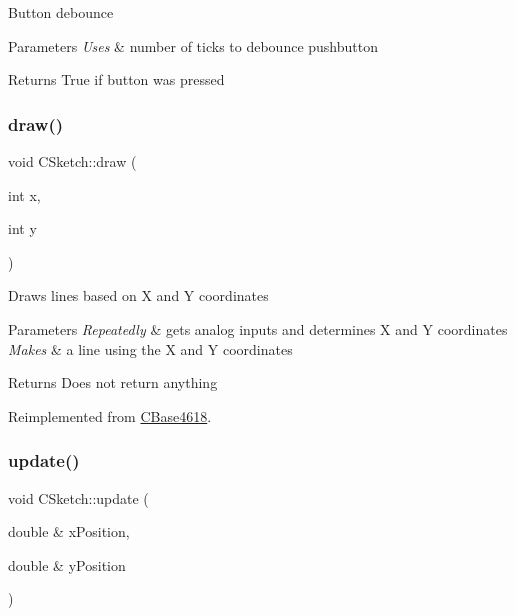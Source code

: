 Button debounce


\begin{DoxyParams}{Parameters}
{\em Uses} & number of ticks to debounce pushbutton\\
\hline
\end{DoxyParams}
\begin{DoxyReturn}{Returns}
True if button was pressed 
\end{DoxyReturn}
\hypertarget{class_c_sketch_a9b5af655812ecfa15791f5199854a3a4}{}\label{class_c_sketch_a9b5af655812ecfa15791f5199854a3a4} 
\subsubsection{\texorpdfstring{draw()}{draw()}}
{\footnotesize\ttfamily void C\+Sketch\+::draw (\begin{DoxyParamCaption}\item[{int}]{x,  }\item[{int}]{y }\end{DoxyParamCaption})\hspace{0.3cm}{\ttfamily [virtual]}}

Draws lines based on X and Y coordinates


\begin{DoxyParams}{Parameters}
{\em Repeatedly} & gets analog inputs and determines X and Y coordinates \\
\hline
{\em Makes} & a line using the X and Y coordinates\\
\hline
\end{DoxyParams}
\begin{DoxyReturn}{Returns}
Does not return anything 
\end{DoxyReturn}


Reimplemented from \hyperlink{class_c_base4618_aa4e8190003db02c98e7e6bdcfdf0ee1a}{C\+Base4618}.

\hypertarget{class_c_sketch_a81582a1c6eb7524db76546565412a88b}{}\label{class_c_sketch_a81582a1c6eb7524db76546565412a88b} 
\subsubsection{\texorpdfstring{update()}{update()}}
{\footnotesize\ttfamily void C\+Sketch\+::update (\begin{DoxyParamCaption}\item[{double \&}]{x\+Position,  }\item[{double \&}]{y\+Position }\end{DoxyParamCaption})\hspace{0.3cm}{\ttfamily [virtual]}}


